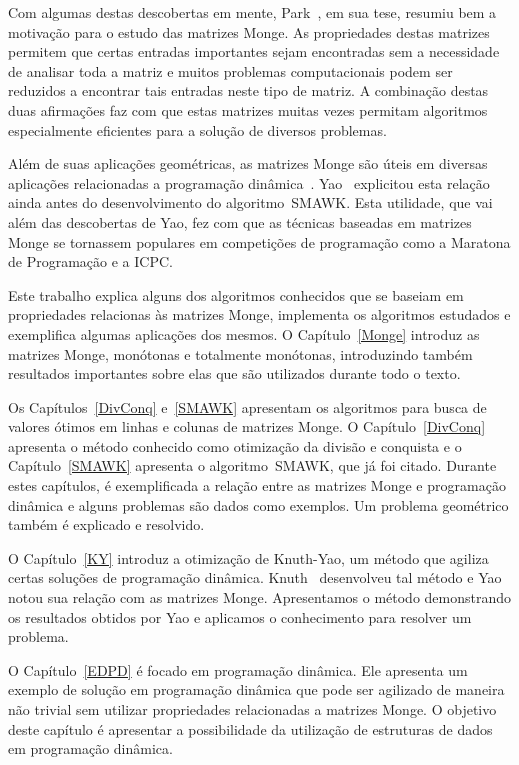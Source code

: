 Com algumas destas descobertas em mente, Park~\cite{Park:1991}, em sua tese, resumiu bem a motivação para o estudo das matrizes Monge. As propriedades destas matrizes permitem que certas entradas importantes sejam encontradas sem a necessidade de analisar toda a matriz e muitos problemas computacionais podem ser reduzidos a encontrar tais entradas neste tipo de matriz. A combinação destas duas afirmações faz com que estas matrizes muitas vezes permitam algoritmos especialmente eficientes para a solução de diversos problemas.

Além de suas aplicações geométricas, as matrizes Monge são úteis em diversas aplicações relacionadas a programação dinâmica~\cite{Bein:2009,Burkard:1996,Galil:1992}. Yao~\cite{Yao:1980,Yao:1982} explicitou esta relação ainda antes do desenvolvimento do algoritmo~\textsc{SMAWK}. Esta utilidade, que vai além das descobertas de Yao, fez com que as técnicas baseadas em matrizes Monge se tornassem populares em competições de programação como a Maratona de Programação e a ICPC.

Este trabalho explica alguns dos algoritmos conhecidos que se baseiam em propriedades relacionas às matrizes Monge, implementa os algoritmos estudados e exemplifica algumas aplicações dos mesmos. O Capítulo~\ref{Monge} introduz as matrizes Monge, monótonas e totalmente monótonas, introduzindo também resultados importantes sobre elas que são utilizados durante todo o texto. 

Os Capítulos~\ref{DivConq} e~\ref{SMAWK} apresentam os algoritmos para busca de valores ótimos em linhas e colunas de matrizes Monge. O Capítulo~\ref{DivConq} apresenta o método conhecido como otimização da divisão e conquista e o Capítulo~\ref{SMAWK} apresenta o algoritmo~\textsc{SMAWK}, que já foi citado. Durante estes capítulos, é exemplificada a relação entre as matrizes Monge e programação dinâmica e alguns problemas são dados como exemplos. Um problema geométrico também é explicado e resolvido.

O Capítulo~\ref{KY} introduz a otimização de Knuth-Yao, um método que agiliza certas soluções de programação dinâmica. Knuth~\cite{Knuth:1971} desenvolveu tal método e Yao~\cite{Yao:1980,Yao:1982} notou sua relação com as matrizes Monge. Apresentamos o método demonstrando os resultados obtidos por Yao e aplicamos o conhecimento para resolver um problema.

O Capítulo~\ref{EDPD} é focado em programação dinâmica. Ele apresenta um exemplo de solução em programação dinâmica que pode ser agilizado de maneira não trivial sem utilizar propriedades relacionadas a matrizes Monge. O objetivo deste capítulo é apresentar a possibilidade da utilização de estruturas de dados em programação dinâmica. 

